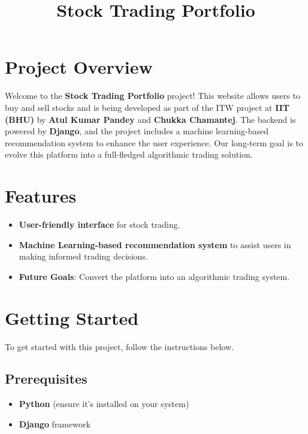 \documentclass{article}
\title{Stock Trading Portfolio}
\date{}
\begin{document}
\maketitle

\section*{Project Overview}

Welcome to the \textbf{Stock Trading Portfolio} project! This website allows users to buy and sell stocks and is being developed as part of the ITW project at \textbf{IIT (BHU)} by \textbf{Atul Kumar Pandey} and \textbf{Chukka Chamantej}. The backend is powered by \textbf{Django}, and the project includes a machine learning-based recommendation system to enhance the user experience. Our long-term goal is to evolve this platform into a full-fledged algorithmic trading solution.

\section*{Features}
\begin{itemize}
    \item \textbf{User-friendly interface} for stock trading.
    \item \textbf{Machine Learning-based recommendation system} to assist users in making informed trading decisions.
    \item \textbf{Future Goals}: Convert the platform into an algorithmic trading system.
\end{itemize}

\section*{Getting Started}

To get started with this project, follow the instructions below.

\subsection*{Prerequisites}
\begin{itemize}
    \item \textbf{Python} (ensure it's installed on your system)
    \item \textbf{Django} framework
\end{itemize}
\end{document}
